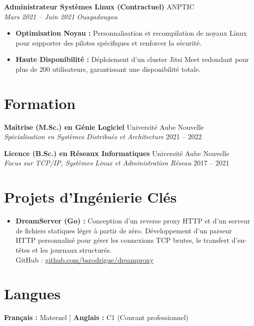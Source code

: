 \documentclass[a4paper,10pt]{article}
\newcommand{\jobheader}[4]{%
    \textbf{#1} \hfill #2 \\
    \textit{#3} \hfill \textit{#4}
    \vspace{0.05cm}
}
\begin{document}
\vspace{0.15cm}

\jobheader{Administrateur Systèmes Linux (Contractuel)}{ANPTIC}{Mars 2021 -- Juin 2021}{Ouagadougou}
\begin{itemize}[leftmargin=*,nosep]
    \item \textbf{Optimisation Noyau :} Personnalisation et recompilation de noyaux Linux pour supporter des pilotes spécifiques et renforcer la sécurité.
    \item \textbf{Haute Disponibilité :} Déploiement d'un cluster Jitsi Meet redondant pour plus de 200 utilisateurs, garantissant une disponibilité totale.
\end{itemize}

\section*{Formation}
\textbf{Maîtrise (M.Sc.) en Génie Logiciel} \hfill Université Aube Nouvelle \\
\textit{Spécialisation en Systèmes Distribués et Architecture} \hfill 2021 -- 2022

\vspace{0.1cm}

\textbf{Licence (B.Sc.) en Réseaux Informatiques} \hfill Université Aube Nouvelle \\
\textit{Focus sur TCP/IP, Systèmes Linux et Administration Réseau} \hfill 2017 -- 2021

\section*{Projets d'Ingénierie Clés}
\begin{itemize}[leftmargin=*,nosep]
    \item \textbf{DreamServer (Go) :} Conception d'un reverse proxy HTTP et d'un serveur de fichiers statiques léger à partir de zéro. Développement d'un parseur HTTP personnalisé pour gérer les connexions TCP brutes, le transfert d'en-têtes et les journaux structurés. \\
    GitHub : \href{https://github.com/bsrodrigue/dreamproxy}{github.com/bsrodrigue/dreamproxy}
\end{itemize}

\vspace{0.1cm}

\section*{Langues}
\textbf{Français :} Maternel | \textbf{Anglais :} C1 (Courant professionnel)
\end{document}
